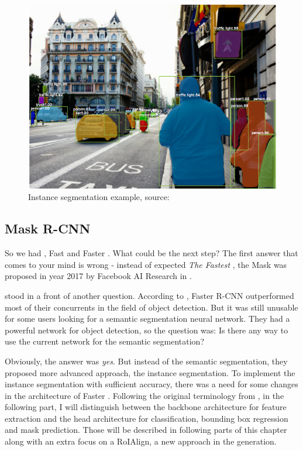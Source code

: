 \begin{figure}[H]
   \centering
	\includegraphics[width=0.8\linewidth]{./pictures/instance-segmentation.png}
	\caption[Instance segmentation example]{Instance segmentation example, source: 
\cite{mask-rcnn}}
      \label{fig:instance-segmentation}
\end{figure}

\subsection{Mask R-CNN}
\label{mask-rcnn}

So we had , Fast  and Faster . What could be the 
next step? The first answer that comes to your mind is wrong - instead of 
expected \textit{The Fastest }, the Mask  was proposed in 
year 2017 by Facebook AI Research  in \cite{mask-rcnn}.

 stood in a front of another question. According to \cite{faster-rcnn}, 
Faster R-CNN outperformed most of their concurrents in the field of object 
detection. But it was still unusable for some users looking for a semantic 
segmentation neural network. They had a powerful network for object detection, 
so the question was: Is there any way to use the current network for the 
semantic segmentation?

Obviously, the answer was \textit{yes}. But instead of the semantic 
segmentation, they proposed more advanced approach, the instance segmentation. 
To implement the instance segmentation with sufficient accuracy, there was a 
need for some changes in the architecture of Faster . Following the 
original terminology from \cite{mask-rcnn}, in the following part, I will 
distinguish between the backbone architecture for feature extraction and the 
head architecture for classification, bounding box regression and mask 
prediction. Those will be described in following parts of this chapter along 
with an extra focus on a RoIAlign, a new approach in the  generation.


